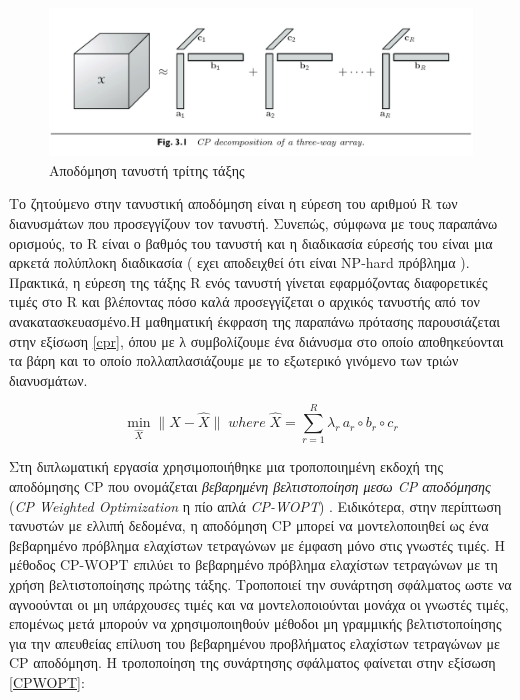 \medskip
\begin{figure}[h]
  \centering
  \includegraphics[scale=0.5]{images/CP.png}
  \caption{Αποδόμηση τανυστή τρίτης τάξης}
  \label{fig:CP}
\end{figure}

\medskip
Το ζητούμενο στην τανυστική αποδόμηση είναι η εύρεση του αριθμού R των διανυσμάτων που προσεγγίζουν τον τανυστή. Συνεπώς, σύμφωνα με τους παραπάνω ορισμούς, το R είναι ο βαθμός του τανυστή και η διαδικασία εύρεσής του είναι μια αρκετά πολύπλοκη διαδικασία ( εχει αποδειχθεί ότι είναι NP-hard πρόβλημα \cite{Håstad2006} ). Πρακτικά, η εύρεση της τάξης R ενός τανυστή γίνεται εφαρμόζοντας διαφορετικές τιμές στο R και βλέποντας πόσο καλά προσεγγίζεται ο αρχικός τανυστής από τον ανακατασκευασμένο.Η μαθηματική έκφραση της παραπάνω πρότασης παρουσιάζεται στην εξίσωση \ref{cpr}, όπου με λ συμβολίζουμε ένα διάνυσμα στο οποίο αποθηκεύονται τα βάρη και το οποίο πολλαπλασιάζουμε με το εξωτερικό γινόμενο των τριών διανυσμάτων. 

{\Large
\begin{equation}\label{cpr}
    \min_{\widehat{X}} \| X - \widehat{X} \| \; where \; \widehat{X} = \sum_{r=1}^{R} \lambda_{r} \, a_r \circ b_r \circ c_r
\end{equation}}

Στη διπλωματική εργασία χρησιμοποιήθηκε μια τροποποιημένη εκδοχή της αποδόμησης CP που ονομάζεται \textit{βεβαρημένη βελτιστοποίηση μεσω CP αποδόμησης } (\textit{CP Weighted Optimization} η πίο απλά \textit{CP-WOPT}) \cite{Acar_2011} \cite{Papastergiou2017}. Ειδικότερα, στην περίπτωση τανυστών με ελλιπή δεδομένα, η αποδόμηση CP μπορεί να μοντελοποιηθεί ως ένα βεβαρημένο πρόβλημα ελαχίστων τετραγώνων με έμφαση μόνο στις γνωστές τιμές. Η μέθοδος CP-WOPT επιλύει το βεβαρημένο πρόβλημα ελαχίστων τετραγώνων με τη χρήση βελτιστοποίησης πρώτης τάξης. Τροποποιεί την συνάρτηση σφάλματος ωστε να αγνοούνται οι μη υπάρχουσες τιμές και να μοντελοποιούνται μονάχα οι γνωστές τιμές, επομένως μετά μπορούν να χρησιμοποιηθούν μέθοδοι μη γραμμικής βελτιστοποίησης για την απευθείας επίλυση του βεβαρημένου προβλήματος ελαχίστων τετραγώνων με CP αποδόμηση. Η τροποποίηση της συνάρτησης σφάλματος φαίνεται στην εξίσωση \ref{CPWOPT}:

